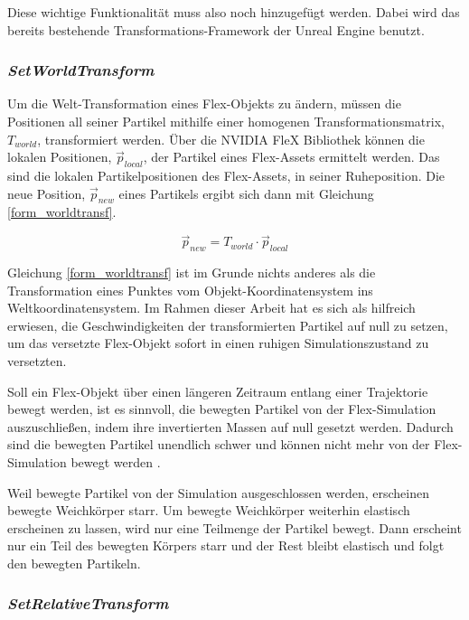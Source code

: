 Diese wichtige Funktionalität muss also noch hinzugefügt werden. Dabei wird das bereits bestehende Transformations-Framework der Unreal Engine benutzt.

\subsubsection{\textit{SetWorldTransform}}

Um die Welt-Transformation eines Flex-Objekts zu ändern, müssen die Positionen all seiner Partikel mithilfe einer homogenen Transformationsmatrix, $T_{world}$, transformiert werden. Über die NVIDIA FleX Bibliothek können die lokalen Positionen, $\vec{p}_{local}$, der Partikel eines Flex-Assets 
ermittelt werden. Das sind die lokalen Partikelpositionen des Flex-Assets, in seiner Ruheposition. Die neue Position, $\vec{p}_{new}$ eines Partikels ergibt sich dann mit Gleichung \ref{form_worldtransf}.

\begin{equation}
\vec{p}_{new} = T_{world} \cdot \vec{p}_{local}
\label{form_worldtransf}
\end{equation}

Gleichung \ref{form_worldtransf} ist im Grunde nichts anderes als die Transformation eines Punktes vom Objekt-Koordinatensystem ins Weltkoordinatensystem. Im Rahmen dieser Arbeit hat es sich als hilfreich erwiesen, die Geschwindigkeiten der transformierten Partikel auf null zu setzen, um das versetzte Flex-Objekt sofort in einen ruhigen Simulationszustand zu versetzten. 

Soll ein Flex-Objekt  über einen längeren Zeitraum entlang einer Trajektorie bewegt werden, ist es sinnvoll, die bewegten Partikel von der Flex-Simulation auszuschließen, indem ihre invertierten Massen auf null gesetzt werden. Dadurch sind die bewegten Partikel unendlich schwer und können nicht mehr von der Flex-Simulation bewegt werden \cite{PBD} \cite{UPP}. 

Weil bewegte Partikel von der Simulation ausgeschlossen werden, erscheinen bewegte Weichkörper starr. Um bewegte Weichkörper weiterhin elastisch erscheinen zu lassen, wird nur eine Teilmenge der Partikel bewegt. Dann erscheint nur ein Teil des bewegten Körpers starr und der Rest bleibt elastisch und folgt den bewegten Partikeln.

\subsubsection{\textit{SetRelativeTransform}}
\label{subsubsec_reltrans}

